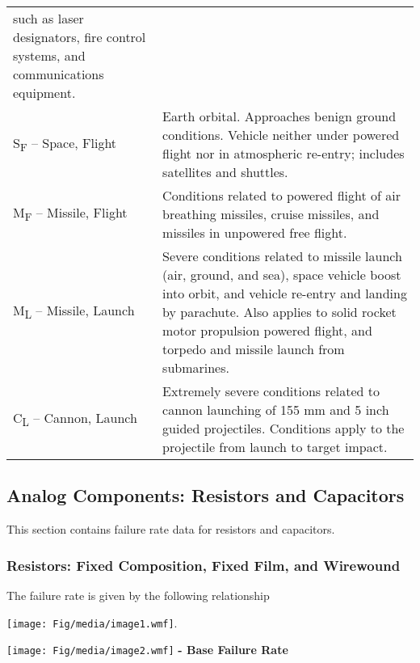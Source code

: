 \begin{longtable}[]{@{}
  >{\raggedright\arraybackslash}p{}
  >{\raggedright\arraybackslash}p{}@{}}
such as laser designators, fire control systems, and communications
equipment. \\
S\textsubscript{F} -- Space, Flight & Earth orbital. Approaches benign
ground conditions. Vehicle neither under powered flight nor in
atmospheric re-entry; includes satellites and shuttles. \\
M\textsubscript{F} -- Missile, Flight & Conditions related to powered
flight of air breathing missiles, cruise missiles, and missiles in
unpowered free flight. \\
M\textsubscript{L} -- Missile, Launch & Severe conditions related to
missile launch (air, ground, and sea), space vehicle boost into orbit,
and vehicle re-entry and landing by parachute. Also applies to solid
rocket motor propulsion powered flight, and torpedo and missile launch
from submarines. \\
C\textsubscript{L} -- Cannon, Launch & Extremely severe conditions
related to cannon launching of 155 mm and 5 inch guided projectiles.
Conditions apply to the projectile from launch to target impact. \\
\end{longtable}

\subsection{Analog Components: Resistors and
Capacitors}\label{analog-components-resistors-and-capacitors}

This section contains failure rate data for resistors and capacitors.

\subsubsection{Resistors: Fixed Composition, Fixed Film, and
Wirewound}\label{resistors-fixed-composition-fixed-film-and-wirewound}

The failure rate is given by the following relationship

\texttt{[image: Fig/media/image1.wmf]}.

\texttt{[image: Fig/media/image2.wmf]} \textbf{- Base Failure Rate}

